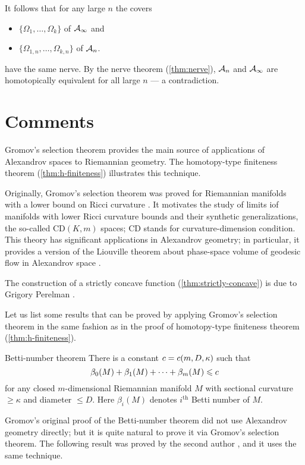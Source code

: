 It follows that for any large $n$ the covers 
\begin{itemize}
\item $\{\Omega_{1},\dots,\Omega_{k}\}$ of $\mathcal{A}_\infty$ and 
\item $\{\Omega_{1,n},\dots,\Omega_{k,n}\}$ of $\mathcal{A}_n$.
\end{itemize}
have the same nerve.
By the nerve theorem (\ref{thm:nerve}), $\mathcal{A}_n$ and $\mathcal{A}_\infty$ are homotopically equivalent for all large $n$ --- a contradiction.
\qeds

\section{Comments}

Gromov's selection theorem provides the main source of applications of Alexandrov spaces to Riemannian geometry.
The homotopy-type finiteness theorem (\ref{thm:h-finiteness})  illustrates this technique.

Originally, Gromov's selection theorem was proved for Riemannian manifolds with a lower bound on Ricci curvature \cite{gromov1981}.
It motivates the study of limits iof manifolds with lower Ricci curvature bounds and their synthetic generalizations, the so-called $\mathrm{CD}(K,m)$ spaces; $\mathrm{CD}$ stands for curvature-dimension condition.
This theory has significant applications in Alexandrov geometry;
in particular, it provides a version of the Liouville theorem about phase-space volume of geodesic flow in Alexandrov space \cite{brue-mondino-semola}.

The construction of a strictly concave function (\ref{thm:strictly-concave}) is due to Grigory Perelman \cite{perelman1993,perelman-petrunin}.

Let us list some results that can be proved by applying Gromov's selection theorem
in the same fashion as in the proof of homotopy-type finiteness theorem (\ref{thm:h-finiteness}).

\begin{thm}{Betti-number theorem}
There is a constant $c=c(m,D,\kappa)$ such that 
\[\beta_0(M)+\beta_1(M)+\dots+\beta_m(M)\leqslant c\]
for any closed $m$-dimensional Riemannian manifold $M$ with sectional curvature $\ge \kappa$ and diameter $\le D$.
Here $\beta_i(M)$ denotes $i^\text{th}$ Betti number of $M$.
\end{thm}

Gromov's original proof \cite{gromov-1981} of the Betti-number theorem did not use Alexandrov geometry directly;
but it is quite natural to prove it via Gromov's selection theorem.
The following result was proved by the second author \cite{petrunin2008}, and it uses the same technique.

